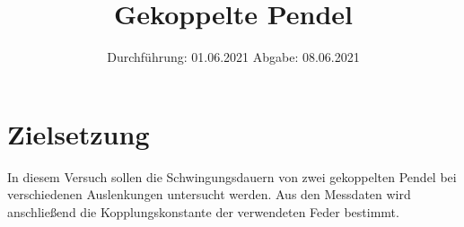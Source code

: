 
\usepackage{parskip}

\subject{V106}
\title{Gekoppelte Pendel}
\date{
    Durchführung: 01.06.2021
    \hspace{3em}
    Abgabe: 08.06.2021
}



\maketitle
\thispagestyle{empty}
\tableofcontents
\newpage

\section{Zielsetzung}

    In diesem Versuch sollen die Schwingungsdauern von zwei gekoppelten Pendel bei verschiedenen Auslenkungen untersucht werden.
    Aus den Messdaten wird anschließend die Kopplungskonstante der verwendeten Feder bestimmt.
       
    

\clearpage


\clearpage

%

%

\printbibliography


